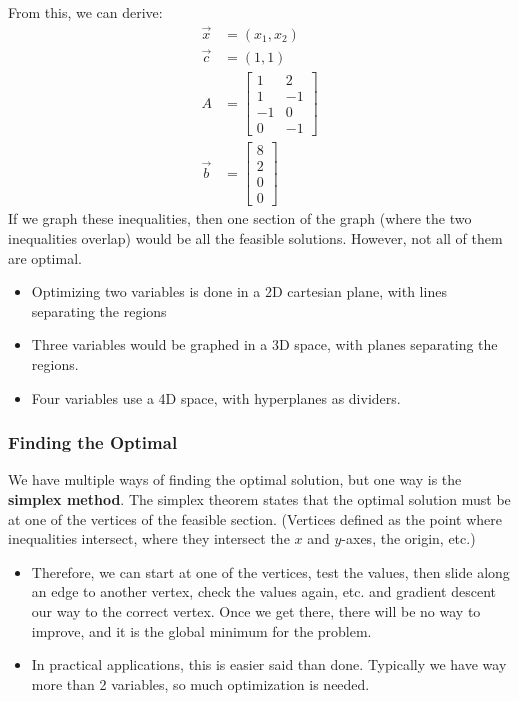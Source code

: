 \documentclass[10pt]{article}
\begin{document}
From this, we can derive:
\begin{align*}
    \vec{x} &= (x_1, x_2)\\
    \vec{c} &= (1, 1)\\
    A &= \begin{bmatrix} 1 & 2 \\ 1 & -1 \\ -1 & 0 \\ 0 & -1\end{bmatrix}\\
    \vec{b} &= \begin{bmatrix} 8 \\ 2 \\ 0 \\ 0 \end{bmatrix}
\end{align*}
If we graph these inequalities, then one section of the graph (where the two inequalities overlap) would be all the feasible solutions.  However, not all of them are optimal.
\begin{itemize}
    \item Optimizing two variables is done in a 2D cartesian plane, with lines separating the regions
    \item Three variables would be graphed in a 3D space, with planes separating the regions.
    \item Four variables use a 4D space, with hyperplanes as dividers.
\end{itemize}
\subsubsection*{Finding the Optimal}
We have multiple ways of finding the optimal solution, but one way is the \textbf{simplex method}.  The simplex theorem states that the optimal solution must be at one of the vertices of the feasible section.  (Vertices defined as the point where inequalities intersect, where they intersect the $x$ and $y$-axes, the origin, etc.)
\begin{itemize}
	\item Therefore, we can start at one of the vertices, test the values, then slide along an edge to another vertex, check the values again, etc. and gradient descent our way to the correct vertex.  Once we get there, there will be no way to improve, and it is the global minimum for the problem.
	\item In practical applications, this is easier said than done.  Typically we have way more than 2 variables, so much optimization is needed.
\end{itemize}
\end{document}
